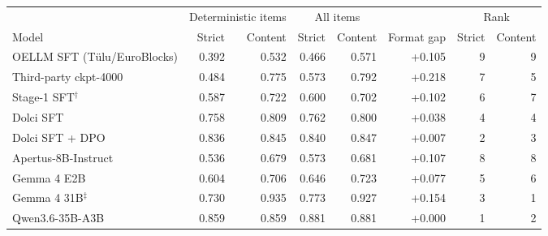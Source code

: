 \begin{tabular}{lrrrrrrr}
\toprule
 & \multicolumn{2}{c}{Deterministic items} & \multicolumn{2}{c}{All items} & & \multicolumn{2}{c}{Rank} \\
\cmidrule(lr){2-3}\cmidrule(lr){4-5}\cmidrule(lr){7-8}
Model & Strict & Content & Strict & Content & Format gap & Strict & Content \\
\midrule
OELLM SFT (T\"ulu/EuroBlocks) & 0.392 & 0.532 & 0.466 & 0.571 & +0.105 & 9 & 9 \\
Third-party ckpt-4000 & 0.484 & 0.775 & 0.573 & 0.792 & +0.218 & 7 & 5 \\
Stage-1 SFT$^\dagger$ & 0.587 & 0.722 & 0.600 & 0.702 & +0.102 & 6 & 7 \\
Dolci SFT & 0.758 & 0.809 & 0.762 & 0.800 & +0.038 & 4 & 4 \\
Dolci SFT + DPO & 0.836 & 0.845 & 0.840 & 0.847 & +0.007 & 2 & 3 \\
\midrule
Apertus-8B-Instruct & 0.536 & 0.679 & 0.573 & 0.681 & +0.107 & 8 & 8 \\
Gemma 4 E2B & 0.604 & 0.706 & 0.646 & 0.723 & +0.077 & 5 & 6 \\
Gemma 4 31B$^\ddagger$ & 0.730 & 0.935 & 0.773 & 0.927 & +0.154 & 3 & 1 \\
Qwen3.6-35B-A3B & 0.859 & 0.859 & 0.881 & 0.881 & +0.000 & 1 & 2 \\
\bottomrule
\end{tabular}
